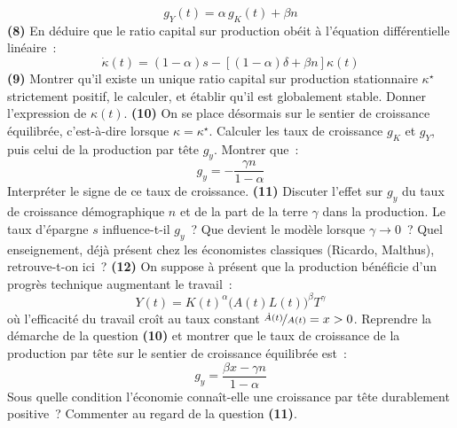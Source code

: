 \documentclass[11pt,a4paper,notitlepage,twocolumn]{article}
\begin{document}
\[
g_Y(t) = \alpha\, g_K(t) + \beta n
\]
\textbf{(8)} En déduire que le ratio capital sur production obéit à
l'équation différentielle linéaire~:
\[
\dot\kappa(t) = (1-\alpha)s - \left[(1-\alpha)\delta + \beta n\right]\kappa(t)
\]
\textbf{(9)} Montrer qu'il existe un unique ratio capital sur
production stationnaire $\kappa^{\star}$ strictement positif, le
calculer, et établir qu'il est globalement stable. Donner l'expression
de $\kappa(t)$. \textbf{(10)} On se place désormais sur le sentier de
croissance équilibrée, c'est-à-dire lorsque $\kappa=\kappa^{\star}$.
Calculer les taux de croissance $g_K$ et $g_Y$, puis celui de la
production par tête $g_y$. Montrer que~:
\[
g_y = -\frac{\gamma n}{1-\alpha}
\]
Interpréter le signe de ce taux de croissance. \textbf{(11)} Discuter
l'effet sur $g_y$ du taux de croissance démographique $n$ et de la
part de la terre $\gamma$ dans la production. Le taux d'épargne $s$
influence-t-il $g_y$~? Que devient le modèle lorsque
$\gamma\rightarrow 0$~? Quel enseignement, déjà présent chez les
économistes classiques (Ricardo, Malthus), retrouve-t-on
ici~? \textbf{(12)} On suppose à présent que la production bénéficie
d'un progrès technique augmentant le travail~:
\[
Y(t) = K(t)^{\alpha}\bigl(A(t)L(t)\bigr)^{\beta}T^{\gamma}
\]
où l'efficacité du travail croît au taux constant
$\nicefrac{\dot A(t)}{A(t)}=x>0$. Reprendre la démarche de la question
\textbf{(10)} et montrer que le taux de croissance de la production
par tête sur le sentier de croissance équilibrée est~:
\[
g_y = \frac{\beta x - \gamma n}{1-\alpha}
\]
Sous quelle condition l'économie connaît-elle une croissance par tête
durablement positive~? Commenter au regard de la question
\textbf{(11)}.
\end{document}
